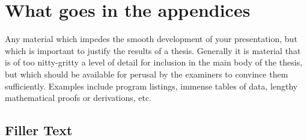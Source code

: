 \chapter{What goes in the appendices}
\label{app:a}
Any material which impedes the smooth development
of your presentation, but which is important to justify the results of a
thesis. Generally it is material that is of too nitty-gritty a level of detail
for inclusion in the main body of the thesis, but which should be available
for perusal by the examiners to convince them sufficiently. Examples include
program listings, immense tables of data, lengthy mathematical proofs or
derivations, etc. 

\section{Filler Text}
\Blindtext




